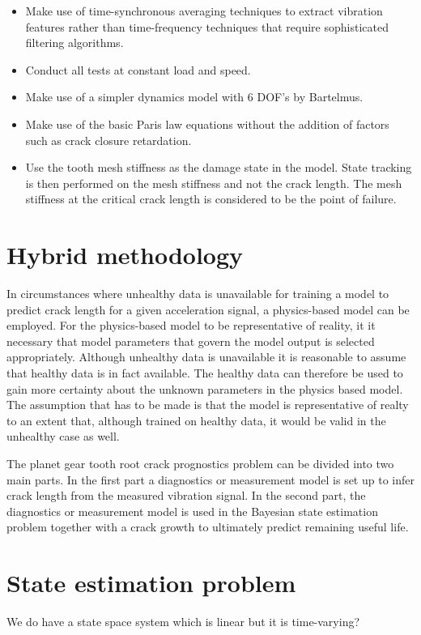 \begin{itemize}
	\item Make use of time-synchronous averaging techniques to extract vibration features rather than time-frequency techniques that require sophisticated filtering algorithms. 
	\item Conduct all tests at constant load and speed.
	\item Make use of a simpler dynamics model with 6 DOF's by Bartelmus. 
	\item Make use of the basic Paris law equations without the addition of factors such as crack closure retardation. 
	\item Use the tooth mesh stiffness as the damage state in the model. State tracking is then performed on the mesh stiffness and not the crack length. The mesh stiffness at the critical crack length is considered to be the point of failure.
\end{itemize}


\section{Hybrid methodology}
In circumstances where unhealthy data is unavailable for training a model to predict crack length for a given acceleration signal, a physics-based model can be employed. For the physics-based model to be representative of reality, it it necessary that model parameters that govern the model output is selected appropriately. Although unhealthy data is unavailable it is reasonable to assume that healthy data is in fact available. The healthy data can therefore be used to gain more certainty about the unknown parameters in the physics based model. The assumption that has to be made is that the model is representative of realty to an extent that, although trained on healthy data, it would be valid in the unhealthy case as well. 

The planet gear tooth root crack prognostics problem can be divided into two main parts. In the first part a diagnostics or measurement model is set up to infer crack length from the measured vibration signal. In the second part, the diagnostics or measurement model is used in the Bayesian state estimation problem together with a crack growth to ultimately predict remaining useful life. 





\section{State estimation problem}
We do have a state space system which is linear but it is time-varying?

